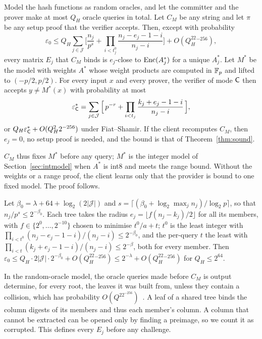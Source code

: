 \begin{theorem}
\label{thm:untrusted}
Model the hash functions as random oracles, and let the committer and the prover make at most $Q_H$
oracle queries in total. Let $C_M$ be any string and let $\pi$ be any setup proof that the verifier
accepts. Then, except with probability
\[
  \varepsilon_0\le Q_H\sum_{j\in\mathcal J}\Big[\frac{n_j}{p^s}+\prod_{i<t^0_j}
  \frac{n_j-e_j-1-i}{n_j-i}\Big]+O(Q_H^22^{-256}),
\]
every matrix $E_j$ that $C_M$ binds is $e_j$-close to $\mathrm{Enc}(A^*_j)$ for a unique $A^*_j$. Let
$M^*$ be the model with weights $A^*$ whose weight products are computed in $\mathbb{F}_p$ and lifted to
$(-p/2,p/2)$. For every input $x$ and every prover, the verifier of mode $\mathsf{C}$ then accepts
$y\neq M^*(x)$ with probability at most
\[
  \varepsilon^*_{\mathsf{C}}=\sum_{j\in\mathcal J}\Big[\,p^{-r}+\prod_{i<t_j}\frac{k_j+e_j-1-i}{n_j-i}\,\Big],
\]
or $Q_H\varepsilon^*_{\mathsf{C}}+O(Q_H^22^{-256})$ under Fiat--Shamir. If the client recomputes $C_M$, then
$e_j=0$, no setup proof is needed, and the bound is that of Theorem~\ref{thm:sound}.
\end{theorem}

\noindent $C_M$ thus fixes $M^*$ before any query; $M^*$ is the integer model of
Section~\ref{sec:intmodel} when $A^*$ is int8 and meets the range bound. Without the weights or a
range proof, the client learns only that the provider is bound to one fixed model. The proof
follows.

 Let $\beta_0=\lambda+64+\log_2(2|\mathcal J|)$ and
$s=\lceil(\beta_0+\log_2\max_jn_j)/\log_2p\rceil$, so that $n_j/p^s\le2^{-\beta_0}$. Each tree takes
the radius $e_j=\lfloor f(n_j-k_j)/2\rfloor$ for all its members, with $f\in\{2^0,\dots,2^{-10}\}$
chosen to minimise $t^0/a+t$; $t^0$ is the least integer with
$\prod_{i<t^0}(n_j-e_j-1-i)/(n_j-i)\le2^{-\beta_0}$, and the per-query $t$ the least with
$\prod_{i<t}(k_j+e_j-1-i)/(n_j-i)\le2^{-\beta}$, both for every member. Then
$\varepsilon_0\le Q_H\cdot2|\mathcal J|\cdot2^{-\beta_0}+O(Q_H^22^{-256})\le2^{-\lambda}+O(Q_H^22^{-256})$ for
$Q_H\le2^{64}$.

 In the random-oracle model, the oracle queries made before $C_M$ is output
determine, for every root, the leaves it was built from, unless they contain a collision, which has
probability $O(Q^22^{-256})$~\cite{bcs16}. A leaf of a shared tree binds the column digests of its
members and thus each member's column. A column that cannot be extracted can be opened only by
finding a preimage, so we count it as corrupted. This defines every $E_j$ before any challenge.

